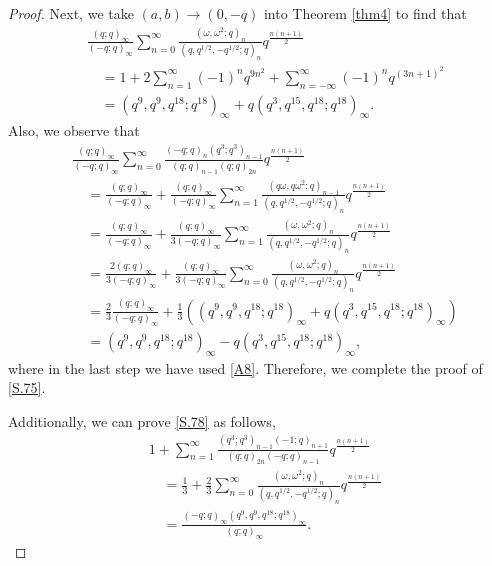\documentclass[reqno,12pt]{amsart}
\theoremstyle{remark}
\numberwithin{equation}{section}
\begin{document}
\begin{proof}
Next,  we take $\left(a,b\right)\to\left(0,-q\right)$ into Theorem \ref{thm4} to find that 
\begin{align}
&\frac{\left(q;q\right)_{\infty}}{\left(-q;q\right)_{\infty}}
\sum_{n=0}^{\infty}\frac{\left(\omega,\omega^2;q\right)_n}
{\left(q,q^{1/2},-q^{1/2};q\right)_n}
q^{\frac{n\left(n+1\right)}{2}}\nonumber\\
&\quad=1+2\sum_{n=1}^{\infty}\left(-1\right)^nq^{9n^2}
+\sum_{n=-\infty}^{\infty}\left(-1\right)^nq^{\left(3n+1\right)^2}\nonumber\\
&\quad=\left(q^9,q^9,q^{18};q^{18}\right)_{\infty}
+q\left(q^3,q^{15},q^{18};q^{18}\right)_{\infty}.\label{A4}
\end{align}
Also, we observe that
\begin{align}
&\frac{\left(q;q\right)_{\infty}}{\left(-q;q\right)_{\infty}}\sum_{n=0}^{\infty}\frac{\left(-q;q\right)_n\left(q^3;q^3\right)_{n-1}
}
{\left(q;q\right)_{n-1}\left(q;q\right)_{2n}}q^{\frac{n(n+1)}{2}}\nonumber\\
&\quad=\frac{\left(q;q\right)_{\infty}}{\left(-q;q\right)_{\infty}}+\frac{\left(q;q\right)_{\infty}}{\left(-q;q\right)_{\infty}}\sum_{n=1}^{\infty}\frac{\left(q\omega,q\omega^2;q\right)_{n-1}}
{\left(q,q^{1/2},-q^{1/2};q\right)_n}q^{\frac{n\left(n+1\right)}{2}}\nonumber\\
&\quad=\frac{\left(q;q\right)_{\infty}}{\left(-q;q\right)_{\infty}}+\frac{\left(q;q\right)_{\infty}}{3\left(-q;q\right)_{\infty}}\sum_{n=1}^{\infty}\frac{\left(\omega,\omega^2;q\right)_{n}}
{\left(q,q^{1/2},-q^{1/2};q\right)_n}q^{\frac{n\left(n+1\right)}{2}}\nonumber\\
&\quad=\frac{2\left(q;q\right)_{\infty}}{3\left(-q;q\right)_{\infty}}+\frac{\left(q;q\right)_{\infty}}{3\left(-q;q\right)_{\infty}}\sum_{n=0}^{\infty}
\frac{\left(\omega,\omega^2;q\right)_{n}}
{\left(q,q^{1/2},-q^{1/2};q\right)_n}q^{\frac{n\left(n+1\right)}{2}}\nonumber\\
&\quad=\frac{2}{3}\frac{\left(q;q\right)_{\infty}}{\left(-q;q\right)_{\infty}}
+\frac{1}{3}\left(\left(q^9,q^9,q^{18};q^{18}\right)_{\infty}
+q\left(q^3,q^{15},q^{18};q^{18}\right)_{\infty}
\right)\nonumber\\
&\quad=\left(q^9,q^9,q^{18};q^{18}\right)_{\infty}
-q\left(q^3,q^{15},q^{18};q^{18}\right)_{\infty},\nonumber
\end{align}
where in the last step we have used \eqref{A8}.
Therefore, we complete the proof of \eqref{S.75}.

Additionally, we can prove \eqref{S.78} as follows,
\begin{align*}
&1+\sum_{n=1}^{\infty}\frac{\left(q^3;q^3\right)_{n-1}\left(-1;q\right)_{n+1}}
{\left(q;q\right)_{2n}\left(-q;q\right)_{n-1}}q^{\frac{n(n+1)}{2}}\\
&\quad=
\frac{1}{3}+\frac{2}{3}\sum_{n=0}^{\infty}\frac{\left(\omega,\omega^2;q\right)_n}{\left(q,q^{1/2},-q^{1/2};q\right)_n}q^{\frac{n(n+1)}{2}}
\\
&\quad=\frac{\left(-q;q\right)_{\infty}\left(q^9,q^9,q^{18};q^{18}\right)_{\infty}}{\left(q;q\right)_{\infty}}.
\end{align*}




\end{proof}
\end{document}
